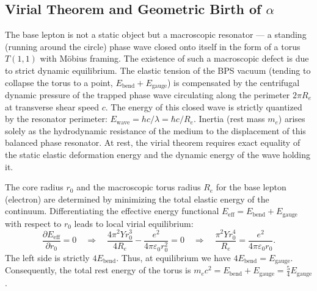 \documentclass[11pt,a4paper]{article}
\begin{document}
\subsection{Virial Theorem and Geometric Birth of $\alpha$}
\label{virial}
The base lepton is not a static object but a macroscopic resonator — a standing (running around the circle) phase wave closed onto itself in the form of a torus $T(1,1)$ with Möbius framing.
The existence of such a macroscopic defect is due to strict dynamic equilibrium. The elastic tension of the BPS vacuum (tending to collapse the torus to a point, $E_{\text{bend}} + E_{\text{gauge}}$) is compensated by the centrifugal dynamic pressure of the trapped phase wave circulating along the perimeter $2\pi R_e$ at transverse shear speed $c$. The energy of this closed wave is strictly quantized by the resonator perimeter: $E_{\text{wave}} = hc / \lambda = \hbar c / R_e$.
Inertia (rest mass $m_e$) arises solely as the hydrodynamic resistance of the medium to the displacement of this balanced phase resonator. At rest, the virial theorem requires exact equality of the static elastic deformation energy and the dynamic energy of the wave holding it.

The core radius $r_0$ and the macroscopic torus radius $R_e$ for the base lepton (electron) are determined by minimizing the total elastic energy of the continuum.
Differentiating the effective energy functional $E_{\text{eff}} = E_{\text{bend}} + E_{\text{gauge}}$ with respect to $r_0$ leads to local virial equilibrium:
\begin{equation}
\frac{\partial E_{\text{eff}}}{\partial r_0} = 0 \quad \Longrightarrow \quad \frac{4 \pi^2 Y r_0^3}{4R_e} - \frac{e^2}{4\pi\varepsilon_0 r_0^2} = 0 \quad \Longrightarrow \quad \frac{\pi^2 Y r_0^4}{R_e} = \frac{e^2}{4\pi\varepsilon_0 r_0}.
\end{equation}
The left side is strictly $4 E_{\text{bend}}$. Thus, at equilibrium we have $4 E_{\text{bend}} = E_{\text{gauge}}$.
Consequently, the total rest energy of the torus is $m_e c^2 = E_{\text{bend}} + E_{\text{gauge}} = \frac{5}{4} E_{\text{gauge}}$.
\end{document}
